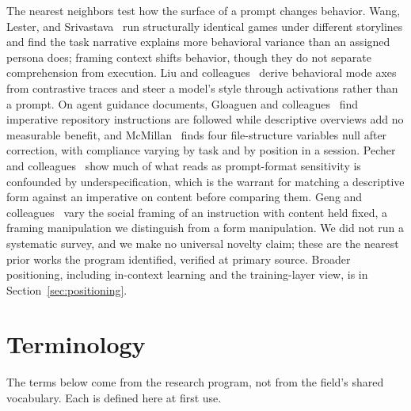 \documentclass[11pt,a4paper]{article}
\begin{document}
The nearest neighbors test how the surface of a prompt changes behavior. Wang, Lester,
and Srivastava~\citep{wang2026narrative} run structurally identical games under
different storylines and find the task narrative explains more behavioral variance than
an assigned persona does; framing context shifts behavior, though they do not separate
comprehension from execution. Liu and colleagues~\citep{liu2026behavioral} derive
behavioral mode axes from contrastive traces and steer a model's style through
activations rather than a prompt. On agent guidance documents,
Gloaguen and colleagues~\citep{gloaguen2026agents} find imperative repository
instructions are followed while descriptive overviews add no measurable benefit, and
McMillan~\citep{mcmillan2026instruction} finds four file-structure variables null after
correction, with compliance varying by task and by position in a session. Pecher and
colleagues~\citep{pecher2026revisiting} show much of what reads as prompt-format
sensitivity is confounded by underspecification, which is the warrant for matching a
descriptive form against an imperative on content before comparing them. Geng and
colleagues~\citep{geng2026measuring} vary the social framing of an instruction with
content held fixed, a framing manipulation we distinguish from a form manipulation. We
did not run a systematic survey, and we make no universal novelty claim; these are the
nearest prior works the program identified, verified at primary source. Broader
positioning, including in-context learning and the training-layer view, is in
Section~\ref{sec:positioning}.

\section{Terminology}\label{sec:terms}

The terms below come from the research program, not from the field's shared vocabulary.
Each is defined here at first use.
\end{document}
